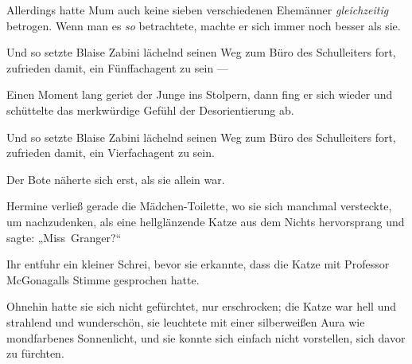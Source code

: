 Allerdings hatte Mum auch keine sieben verschiedenen Ehemänner \emph{gleichzeitig} betrogen. Wenn man es \emph{so} betrachtete, machte er sich immer noch besser als sie.

Und so setzte Blaise Zabini lächelnd seinen Weg zum Büro des Schulleiters fort, zufrieden damit, ein Fünffachagent zu sein —

Einen Moment lang geriet der Junge ins Stolpern, dann fing er sich wieder und schüttelte das merkwürdige Gefühl der Desorientierung ab.

Und so setzte Blaise Zabini lächelnd seinen Weg zum Büro des Schulleiters fort, zufrieden damit, ein Vierfachagent zu sein.


Der Bote näherte sich erst, als sie allein war.

Hermine verließ gerade die Mädchen-Toilette, wo sie sich manchmal versteckte, um nachzudenken, als eine hellglänzende Katze aus dem Nichts hervorsprang und sagte:
„Miss~Granger?“

Ihr entfuhr ein kleiner Schrei, bevor sie erkannte, dass die Katze mit Professor McGonagalls Stimme gesprochen hatte.

Ohnehin hatte sie sich nicht gefürchtet, nur erschrocken; die Katze war hell und strahlend und wunderschön, sie leuchtete mit einer silberweißen Aura wie mondfarbenes Sonnenlicht, und sie konnte sich einfach nicht vorstellen, sich davor zu fürchten.

